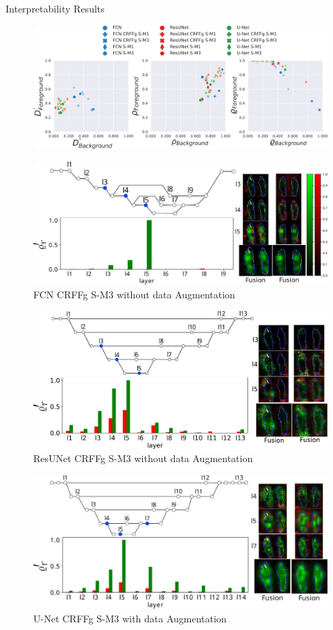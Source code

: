 \documentclass[aspectratio=169]{beamer}
\begin{document}
\begin{frame}[allowframebreaks]{Interpretability Results}

\begin{figure}
    \centering
    \includegraphics[width=1\linewidth]{Figures/interpretability_results_infrared_thermal_feet.pdf}
\end{figure}
\framebreak
\begin{figure}
    \centering
    \includegraphics[width=0.89\linewidth]{Figures/fcn_best.pdf}
    \caption{FCN CRFFg S-M3 without data Augmentation}
\end{figure}
\framebreak

\begin{figure}
    \centering
    \includegraphics[width=0.79\linewidth]{Figures/resunet_best.pdf}
    \caption{ResUNet CRFFg S-M3 without data Augmentation}
\end{figure}
\framebreak

\begin{figure}
    \centering
    \includegraphics[width=0.79\linewidth]{Figures/unet_best.pdf}
    \caption{U-Net CRFFg S-M3 with data Augmentation}
\end{figure}

\end{frame}
\end{document}
